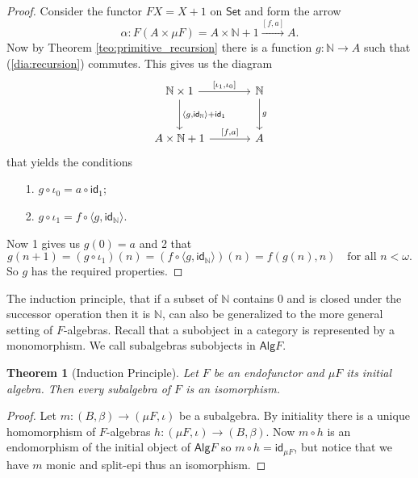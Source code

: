 \documentclass[letterpaper, 11pt, oneside]{memoir}
\theoremstyle{myteo}
\newtheorem{theorem}{Theorem}[section]
\numberwithin{equation}{section}
\newcommand{\id}{\textsf{id}}
\newcommand{\alg}{\textsf{Alg}}
\newcommand{\Set}{\textsf{Set}}
\newcommand{\N}{\mathbb{N}}
\newcommand{\outofcoprod}[2]{{[#1, #2]}}
\newcommand{\intoprod}[2]{{\langle #1, #2\rangle}}
\begin{document}
\begin{proof}
  Consider the functor \(FX = X + 1\) on \(\Set\) and form the arrow
  \begin{equation*}
    \alpha \colon F(A \times \mu F) = A \times \N + 1 \xrightarrow{\outofcoprod{f}{a}} A.
  \end{equation*}
  Now by Theorem \ref{teo:primitive_recursion} there is a function \(g \colon \N \to A\) such that (\ref{dia:recursion}) commutes.
  This gives us the diagram
  \begin{equation}
    \begin{tikzcd}[sep = large]
      \N \times 1 \ar[r, "\outofcoprod{\iota_1}{\iota_0}"] \ar[d, "\intoprod{g}{\id_\N} + \id_1"] & \N \ar[d, "g"]\\
      A \times \N + 1 \ar[r, "\outofcoprod{f}{a}"] & A
    \end{tikzcd}
  \end{equation}
  that yields the conditions
  \begin{enumerate}
  \item[1.] \(g \circ \iota_0 = a \circ \id_1\);
  \item[2.] \(g \circ \iota_1 = f \circ \intoprod{g}{\id_\N}\).
  \end{enumerate}
  Now 1 gives us \(g(0) = a\) and 2 that
  \begin{equation*}
    g(n + 1) = (g \circ \iota_1)(n) = (f \circ \intoprod{g}{\id_\N})(n) = f(g(n), n) \quad \text{for all \(n < \omega\).}
  \end{equation*}
  So \(g\) has the required properties.
\end{proof}

The induction principle, that if a subset of \(\N\) contains \(0\) and is closed under the successor operation then it is \(\N\), can also be generalized to the more general setting of \(F\)-algebras.
Recall that a subobject in a category is represented by a monomorphism.
We call subalgebras subobjects in \(\alg F\).

\begin{theorem}[Induction Principle]
  Let \(F\) be an endofunctor and \(\mu F\) its initial algebra.
  Then every subalgebra of \(F\) is an isomorphism.
\end{theorem}

\begin{proof}
  Let \(m \colon (B, \beta) \to (\mu F, \iota)\) be a subalgebra.
  By initiality there is a unique homomorphism of \(F\)-algebras \(h \colon (\mu F, \iota) \to (B, \beta)\).
  Now \(m \circ h\) is an endomorphism of the initial object of \(\alg F\) so \(m \circ h = \id_{\mu F}\), but notice that we have \(m\) monic and split-epi thus an isomorphism.
\end{proof}
\end{document}
